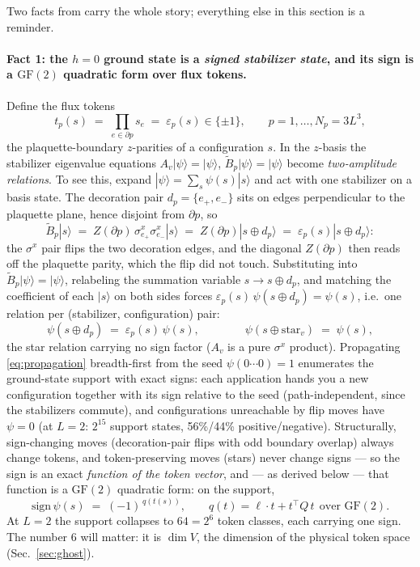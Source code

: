 \documentclass[11pt]{article}
\newcommand{\Av}{A_v}
\newcommand{\Bt}{\tilde B_p}
\newcommand{\ket}[1]{|#1\rangle}
\newcommand{\sx}{\sigma^x}
\newcommand{\GF}{\mathrm{GF}(2)}
\begin{document}
Two facts from \cite{SignNote} carry the whole story; everything else in this
section is a reminder.

\paragraph{Fact 1: the $h=0$ ground state is a \emph{signed stabilizer
state}, and its sign is a $\GF$ quadratic form over flux tokens.}
Define the flux tokens
\begin{equation}
t_p(s) \;=\; \prod_{e\in\partial p} s_e \;=\; \varepsilon_p(s)\in\{\pm1\},
\qquad p = 1,\dots,N_p=3L^3 ,
\label{eq:tokens}
\end{equation}
the plaquette-boundary $z$-parities of a configuration $s$. In the $z$-basis
the stabilizer eigenvalue equations $\Av\ket\psi=\ket\psi$,
$\Bt\ket\psi=\ket\psi$ become \emph{two-amplitude relations}. To see this,
expand $\ket\psi=\sum_s\psi(s)\ket s$ and act with one stabilizer on a basis
state. The decoration pair $d_p=\{e_+,e_-\}$ sits on edges perpendicular to
the plaquette plane, hence disjoint from $\partial p$, so
\[
\Bt\ket s \;=\; Z(\partial p)\,\sx_{e_+}\sx_{e_-}\ket s
\;=\; Z(\partial p)\ket{s\oplus d_p}
\;=\; \varepsilon_p(s)\ket{s\oplus d_p} :
\]
the $\sx$ pair flips the two decoration edges, and the diagonal
$Z(\partial p)$ then reads off the plaquette parity, which the flip did not
touch. Substituting into $\Bt\ket\psi=\ket\psi$, relabeling the summation
variable $s\to s\oplus d_p$, and matching the coefficient of each $\ket s$ on
both sides forces $\varepsilon_p(s)\,\psi(s\oplus d_p)=\psi(s)$, i.e.\ one
relation per (stabilizer, configuration) pair:
\begin{equation}
\psi(s\oplus d_p) \;=\; \varepsilon_p(s)\,\psi(s),
\qquad\qquad
\psi(s\oplus \mathrm{star}_v) \;=\; \psi(s),
\label{eq:propagation}
\end{equation}
the star relation carrying no sign factor ($\Av$ is a pure $\sx$ product).
Propagating \eqref{eq:propagation} breadth-first from the seed
$\psi(0\cdots0)=1$ enumerates the ground-state support with exact signs:
each application hands you a new configuration together with its sign
relative to the seed (path-independent, since the stabilizers commute), and
configurations unreachable by flip moves have $\psi=0$ (at $L=2$: $2^{15}$
support states, 56\%/44\% positive/negative). Structurally, sign-changing
moves (decoration-pair flips
with odd boundary overlap) always change tokens, and token-preserving moves
(stars) never change signs --- so the sign is an exact \emph{function of the
token vector}, and --- as derived below --- that function is a $\GF$
quadratic form: on the support,
\begin{equation}
\mathrm{sign}\,\psi(s) \;=\; (-1)^{\,q(t(s))},
\qquad q(t) = \ell\cdot t + t^{\!\top} Q\, t \ \ \text{over } \GF .
\label{eq:quadform}
\end{equation}
At $L=2$ the support collapses to $64 = 2^6$ token classes, each carrying one
sign. The number $6$ will matter: it is $\dim V$, the dimension of the
physical token space (Sec.~\ref{sec:ghost}).
\end{document}
